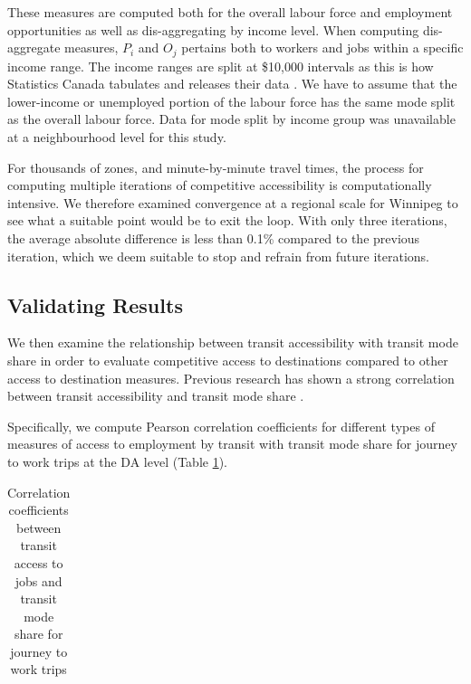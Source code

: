 \documentclass[11 pt, letterpaper]{article}
\begin{document}
{These measures are computed both for the overall labour force and employment opportunities as well as dis-aggregating by income level. When computing dis-aggregate measures, $P_i$ and $O_j$ pertains both to workers and jobs within a specific income range. The income ranges are split at \$10,000 intervals as this is how Statistics Canada tabulates and releases their data \cite{sc2016cdic}. We have to assume that the lower-income or unemployed portion of the labour force has the same mode split as the overall labour force. Data for mode split by income group was unavailable at a neighbourhood level for this study.

For thousands of zones, and minute-by-minute travel times, the process for computing multiple iterations of competitive accessibility is computationally intensive. We therefore examined convergence at a regional scale for Winnipeg to see what a suitable point would be to exit the loop. With only three iterations, the average absolute difference is less than 0.1\% compared to the previous iteration, which we deem suitable to stop and refrain from future iterations.




\subsection{Validating Results}

We then examine the relationship between transit accessibility with transit mode share in order to evaluate competitive access to destinations compared to other access to destination measures. Previous research has shown a strong correlation between transit accessibility and transit mode share \cite{moniruzzaman2012,owen2015,boisjoly2017}.

Specifically, we compute Pearson correlation coefficients for different types of measures of access to employment by transit with transit mode share for journey to work trips at the DA level (Table \ref{cor_acc_mode}). 

\begin{table}[H]
	\centering
	\vspace{4mm}
	\renewcommand{\arraystretch}{0.75} %
	\footnotesize
	\caption{Correlation coefficients between transit access to jobs and transit mode share for journey to work trips}
	\label{cor_acc_mode}
	\begin{tabular}{@{}l|ll|ll|llll@{}}
		

\end{tabular}
\end{table}}
\end{document}
